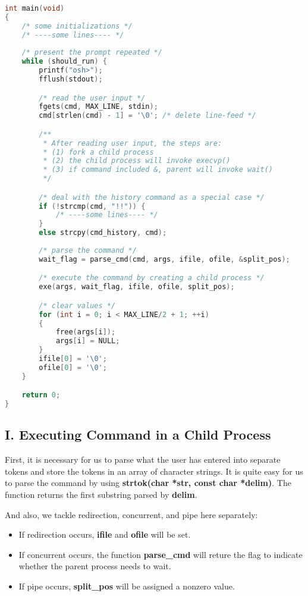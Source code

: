 \documentclass{article}
\begin{document}
\begin{lstlisting}[language=c,caption={main()},captionpos=b]
int main(void)
{
    /* some initializations */
    /* ----some lines---- */
    
    /* present the prompt repeated */
    while (should_run) {   
        printf("osh>");
        fflush(stdout);

        /* read the user input */
        fgets(cmd, MAX_LINE, stdin);
        cmd[strlen(cmd) - 1] = '\0'; /* delete line-feed */

        /**
         * After reading user input, the steps are:
         * (1) fork a child process
         * (2) the child process will invoke execvp()
         * (3) if command included &, parent will invoke wait()
         */

        /* deal with the history command as a special case */
        if (!strcmp(cmd, "!!")) {
            /* ----some lines---- */
        }	
        else strcpy(cmd_history, cmd);
        
        /* parse the command */
        wait_flag = parse_cmd(cmd, args, ifile, ofile, &split_pos);

        /* execute the command by creating a child process */
        exe(args, wait_flag, ifile, ofile, split_pos);

        /* clear values */
        for (int i = 0; i < MAX_LINE/2 + 1; ++i) 
        {	
            free(args[i]);
            args[i] = NULL;
        }
        ifile[0] = '\0';
        ofile[0] = '\0';
    }

    return 0;
}
\end{lstlisting}

\subsection*{I. Executing Command in a Child Process}
First, it is necessary for us to parse what the user has entered into separate tokens and store the tokens in an array of character strings.
It is quite easy for us to parse the command by using \textbf{strtok(char *str, const char *delim)}. The function returns the first substring parsed
by \textbf{delim}. 

And also, we tackle redirection, concurrent, and pipe here separately: 

\begin{itemize}
    \item If redirection occurs, \textbf{ifile} and \textbf{ofile} will be set. 
    \item If concurrent occurs, the function \textbf{parse\_cmd} will reture the flag to indicate whether the parent process needs to wait.
    \item If pipe occurs, \textbf{split\_pos} will be assigned a nonzero value.
\end{itemize}
\end{document}
